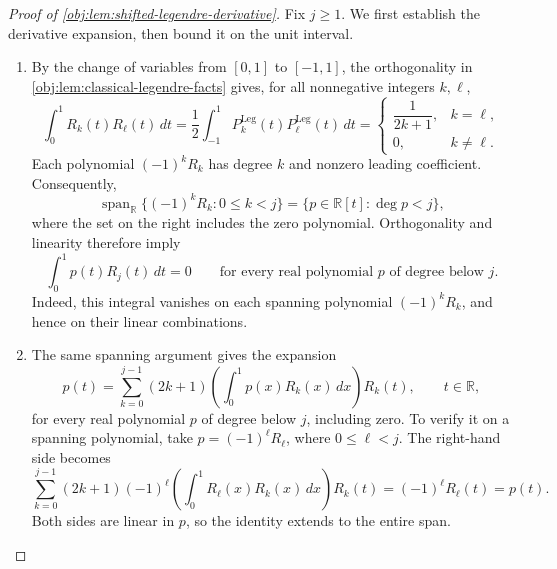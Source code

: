 \begin{proof}[Proof of \cref{obj:lem:shifted-legendre-derivative}]
Fix \(j\ge1\). We first establish the derivative expansion, then bound it on the unit interval.

\begin{enumerate}
\item By the change of variables from \([0,1]\) to \([-1,1]\), the orthogonality in \cref{obj:lem:classical-legendre-facts} gives, for all nonnegative integers \(k,\ell\),
\[
\int_0^1 R_k(t)R_\ell(t)\,dt
=\frac12\int_{-1}^1
P_k^{\mathrm{Leg}}(t)P_\ell^{\mathrm{Leg}}(t)\,dt
=
\begin{cases}
\dfrac{1}{2k+1},&k=\ell,\\
0,&k\ne\ell.
\end{cases}
\]
Each polynomial \((-1)^kR_k\) has degree \(k\) and nonzero leading coefficient. Consequently,
\[
\operatorname{span}_{\mathbb R}\{(-1)^kR_k:0\le k<j\}
=
\{p\in\mathbb R[t]:\deg p<j\},
\]
where the set on the right includes the zero polynomial. Orthogonality and linearity therefore imply
\[
\int_0^1 p(t)R_j(t)\,dt=0
\qquad
\text{for every real polynomial \(p\) of degree below \(j\)}.
\]
Indeed, this integral vanishes on each spanning polynomial \((-1)^kR_k\), and hence on their linear combinations.

\item The same spanning argument gives the expansion
\[
p(t)=
\sum_{k=0}^{j-1}(2k+1)
\left(\int_0^1p(x)R_k(x)\,dx\right)R_k(t),
\qquad t\in\mathbb R,
\]
for every real polynomial \(p\) of degree below \(j\), including zero. To verify it on a spanning polynomial, take \(p=(-1)^\ell R_\ell\), where \(0\le\ell<j\). The right-hand side becomes
\[
\sum_{k=0}^{j-1}(2k+1)(-1)^\ell
\left(\int_0^1R_\ell(x)R_k(x)\,dx\right)R_k(t)
=(-1)^\ell R_\ell(t)=p(t).
\]
Both sides are linear in \(p\), so the identity extends to the entire span.


\end{enumerate}
\end{proof}
